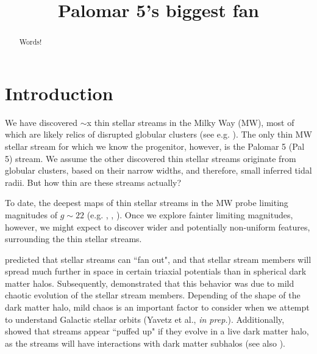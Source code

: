 \documentclass[modern]{aastex62}
\begin{document}
\sloppy\sloppypar\raggedbottom\frenchspacing %

\title{Palomar 5's biggest fan}



\begin{abstract}\noindent %
    Words!
\end{abstract}


\section{Introduction}
\label{sec:intro}
We have discovered $\sim$x thin stellar streams in the Milky Way (MW), most of which are likely relics of disrupted globular clusters (see e.g. \citealt{Ibata:2019}). The only thin MW stellar stream for which we know the progenitor, however, is the Palomar 5 (Pal 5) stream. We assume the other discovered thin stellar streams originate from globular clusters, based on their narrow widths, and therefore, small inferred tidal radii. But how thin are these streams actually? 

To date, the deepest maps of thin stellar streams in the MW probe limiting magnitudes of $g \sim 22$ (e.g. \citealt{Bernard:2016}, \citealt{Ibata:2016}, \citealt{deBoer:2018}). Once we explore fainter limiting magnitudes, however, we might expect to discover wider and potentially non-uniform features, surrounding the thin stellar streams. 

\citet{Pearson:2015} predicted that stellar streams  can ``fan out", and that stellar stream members will spread much further in space in certain triaxial potentials than in spherical dark matter halos. Subsequently, \citet{Price-Whelan:2016} demonstrated that this behavior was due to mild chaotic evolution of the stellar stream members. Depending of the shape of the dark matter halo, mild chaos is an important factor to consider when we attempt to understand Galactic stellar orbits (Yavetz et al., {\it in prep.}). Additionally, \citealt{Bonaca:2014} showed that streams  appear ``puffed up" if they evolve in a live dark matter halo, as the streams will have interactions with dark matter subhalos  (see also \citealt{Ibata:2002}). 
\end{document}
